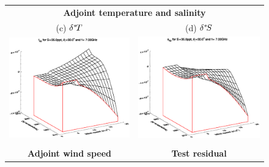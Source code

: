 \begin{figure}[htp]
\begin{tabular}{c c}
    \multicolumn{2}{c}{\sffamily\textbf{Adjoint temperature and salinity}}\\
    \textsf{(c)} $\delta^{*}\! T$ &
    \textsf{(d)} $\delta^{*}\! S$ \\
    \includegraphics[bb=115 240 508 540,clip,scale=0.5]{graphics/Model/TLAD/t_AD_s35.0ppt_z30.0_7.00GHz.eps} &
    \includegraphics[bb=110 240 508 540,clip,scale=0.5]{graphics/Model/TLAD/s_AD_s35.0ppt_z30.0_7.00GHz.eps} \\\\
    {\sffamily\textbf{Adjoint wind speed}} & {\sffamily\textbf{Test residual}} \\

\end{tabular}
\end{figure}
